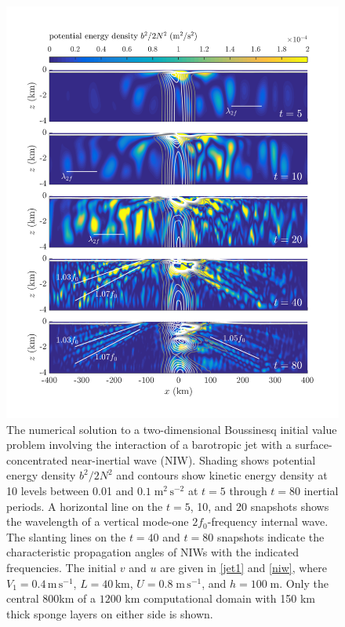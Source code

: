 \documentclass[12pt, oneside]{book}
\begin{document}
\begin{figure}
\centering
\includegraphics[height = 0.83\textheight]{introPdf}
\caption[The numerical solution to a two-dimensional Boussinesq initial value problem involving the interaction of a barotropic jet with a surface-concentrated near-inertial wave (NIW)]{The numerical solution to a two-dimensional Boussinesq initial value problem involving the interaction of a barotropic jet with a surface-concentrated near-inertial wave (NIW).  Shading shows potential energy density $b^2 / 2 N^2$ and contours show kinetic energy density at 10 levels between 0.01 and $0.1 \; \mathrm{m^2 \,  s^{-2}}$ at $t=5$ through $t=80$ inertial periods.  A horizontal line on the $t=5$, 10, and 20 snapshots shows the wavelength of a vertical mode-one $2f_0$-frequency internal wave.  The slanting lines on the $t=40$ and $t=80$ snapshots indicate the characteristic propagation angles of NIWs with the indicated frequencies.  The initial $v$ and $u$ are given in  \eqref{jet1} and \eqref{niw}, where $V_1 = 0.4 \, \mathrm{m \, s^{-1}}$, $L = 40 \, \mathrm{km}$, $U = 0.8 \; \mathrm{m \, s^{-1}}$, and $h=100 \; \mathrm{m}$.  Only the central 800km of a $1200$ km computational domain with 150 km thick sponge layers on either side is shown.}
\label{twof_intro}
\end{figure}
\end{document}
